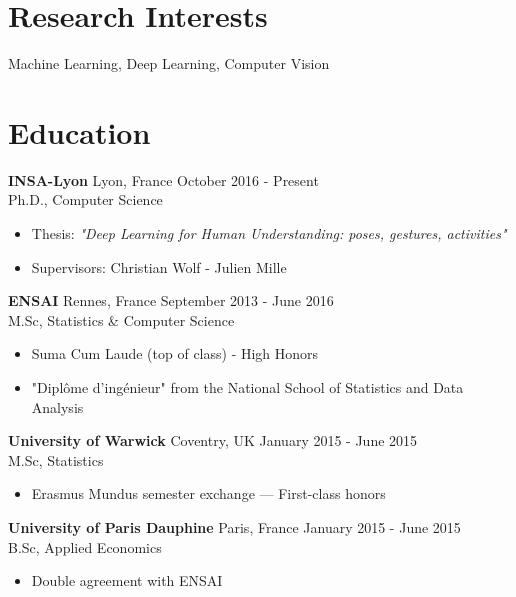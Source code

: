 \documentclass[10pt]{res} %
\begin{document}
\begin{resume}

 
\section{\large Research Interests}  
Machine Learning, Deep Learning, Computer Vision


\section{\large Education}
\textbf{INSA-Lyon} \hfill Lyon, France \hfill October 2016 - Present \\
Ph.D., Computer Science
\begin{itemize}
\item  Thesis: {\sl "Deep Learning for Human Understanding: poses, gestures, activities"}
\item  Supervisors: Christian Wolf - Julien Mille
\end{itemize}


\textbf{ENSAI} \hfill Rennes, France \hfill September 2013 - June 2016 \\
M.Sc, Statistics \& Computer Science
\begin{itemize}
\item Suma Cum Laude (top of class) - High Honors
\item "Diplôme d'ingénieur" from the National School of Statistics and Data Analysis
\end{itemize}

\textbf{University of Warwick} \hfill Coventry, UK \hfill January 2015 - June 2015 \\
M.Sc, Statistics
\begin{itemize}
\item Erasmus Mundus semester exchange --- First-class honors
\end{itemize}

\textbf{University of Paris Dauphine} \hfill Paris, France \hfill January 2015 - June 2015 \\
B.Sc, Applied Economics
\begin{itemize}
\item Double agreement with ENSAI
\end{itemize}


\end{resume}
\end{document}
